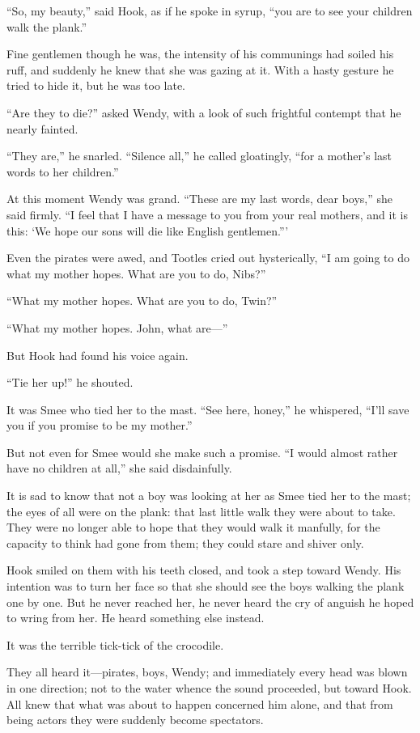``So, my beauty,'' said Hook, as if he spoke in syrup, ``you are to see
your children walk the plank.''

Fine gentlemen though he was, the intensity of his communings had
soiled his ruff, and suddenly he knew that she was gazing at it. With a
hasty gesture he tried to hide it, but he was too late.

``Are they to die?'' asked Wendy, with a look of such frightful contempt
that he nearly fainted.

``They are,'' he snarled. ``Silence all,'' he called gloatingly, ``for a
mother's last words to her children.''

At this moment Wendy was grand. ``These are my last words, dear boys,''
she said firmly. ``I feel that I have a message to you from your real
mothers, and it is this: ‘We hope our sons will die like English
gentlemen.'''

Even the pirates were awed, and Tootles cried out hysterically, ``I am
going to do what my mother hopes. What are you to do, Nibs?''

``What my mother hopes. What are you to do, Twin?''

``What my mother hopes. John, what are---''

But Hook had found his voice again.

``Tie her up!'' he shouted.

It was Smee who tied her to the mast. ``See here, honey,'' he whispered,
``I'll save you if you promise to be my mother.''

But not even for Smee would she make such a promise. ``I would almost
rather have no children at all,'' she said disdainfully.

It is sad to know that not a boy was looking at her as Smee tied her to
the mast; the eyes of all were on the plank: that last little walk they
were about to take. They were no longer able to hope that they would
walk it manfully, for the capacity to think had gone from them; they
could stare and shiver only.

Hook smiled on them with his teeth closed, and took a step toward
Wendy. His intention was to turn her face so that she should see the
boys walking the plank one by one. But he never reached her, he never
heard the cry of anguish he hoped to wring from her. He heard something
else instead.

It was the terrible tick-tick of the crocodile.

They all heard it---pirates, boys, Wendy; and immediately every head was
blown in one direction; not to the water whence the sound proceeded,
but toward Hook. All knew that what was about to happen concerned him
alone, and that from being actors they were suddenly become spectators.

